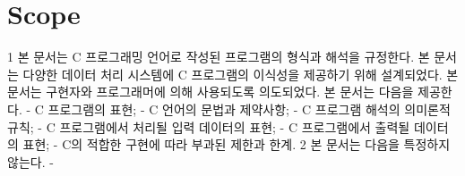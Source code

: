 \section{Scope}

1 
본 문서는 C 프로그래밍 언어로 작성된 프로그램의 형식과 해석을 규정한다. 
본 문서는 다양한 데이터 처리 시스템에 C 프로그램의 이식성을 제공하기 위해 설계되었다. 
본 문서는 구현자와 프로그래머에 의해 사용되도록 의도되었다.
본 문서는 다음을 제공한다.
- C 프로그램의 표현;
- C 언어의 문법과 제약사항;
- C 프로그램 해석의 의미론적 규칙;
- C 프로그램에서 처리될 입력 데이터의 표현;
- C 프로그램에서 출력될 데이터의 표현;
- C의 적합한 구현에 따라 부과된 제한과 한계.
2
본 문서는 다음을 특정하지 않는다.
- 

